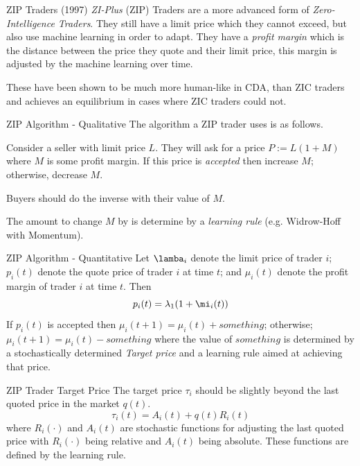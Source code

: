 \documentclass[11pt,a4paper]{article}
\begin{document}
\begin{proposition}{ZIP Traders (1997)}
  \textit{ZI-Plus} (ZIP) Traders are a more advanced form of \textit{Zero-Intelligence Traders}. They still have a limit price which they cannot exceed, but also use machine learning in order to adapt. They have a \textit{profit margin} which is the distance between the price they quote and their limit price, this margin is adjusted by the machine learning over time.
  \par These have been shown to be much more human-like in CDA, than ZIC traders and achieves an equilibrium in cases where ZIC traders could not.
\end{proposition}

\begin{proposition}{ZIP Algorithm - Qualitative}
  The algorithm a ZIP trader uses is as follows.
  \par Consider a seller with limit price $L$. They will ask for a price $P:=L(1+M)$ where $M$ is some profit margin. If this price is \textit{accepted} then increase $M$; otherwise, decrease $M$.
  \par Buyers should do the inverse with their value of $M$.
  \par The amount to change $M$ by is determine by a \textit{learning rule} (e.g. Widrow-Hoff with Momentum).
\end{proposition}

\begin{proposition}{ZIP Algorithm - Quantitative}
  Let $\lamba_i$ denote the limit price of trader $i$; $p_i(t)$ denote the quote price of trader $i$ at time $t$; and $\mu_i(t)$ denote the profit margin of trader $i$ at time $t$. Then
  \[ p_i(t)=\lambda_1(1+\mi_i(t)) \]
  If $p_i(t)$ is accepted then $\mu_i(t+1)=\mu_i(t)+something$; otherwise; $\mu_i(t+1)=\mu_i(t)-something$ where the value of $something$ is determined by a stochastically determined \textit{Target price} and a learning rule aimed at achieving that price.
\end{proposition}

\begin{proposition}{ZIP Trader Target Price}
  The target price $\tau_i$ should be slightly beyond the last quoted price in the market $q(t)$.
  \[ \tau_i(t)=A_i(t)+q(t)R_i(t) \]
  where $R_i(\cdot)$ and $A_i(t)$ are stochastic functions for adjusting the last quoted price with $R_i(\cdot)$ being relative and $A_i(t)$ being absolute. These functions are defined by the learning rule.
\end{proposition}
\end{document}

